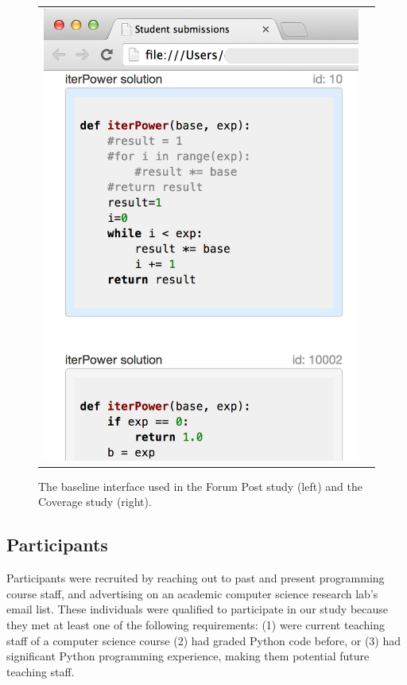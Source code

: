 \begin{figure}[h!]
\begin{tabular}{cc}
\includegraphics[scale=0.37]{Body/figures/overcode/iterPowerEdXControlStudy2.png} \\
\end{tabular}
\caption{The baseline interface used in the Forum Post study (left) and the Coverage study (right).}
\label{iterPowerEdXControl}
\end{figure}
\subsection{Participants}

Participants were recruited by reaching out to past and present programming course staff, and advertising on an academic computer science research lab's email list. These individuals were qualified to participate in our study because they met at least one of the following requirements: (1) were current teaching staff of a computer science course (2) had graded Python code before, or (3) had significant Python programming experience, making them potential future teaching staff. 

